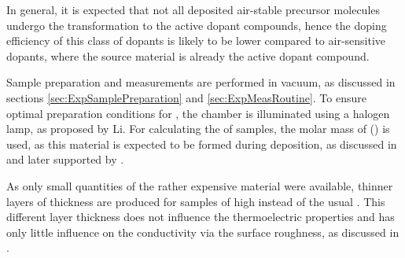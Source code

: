 In general, it is expected that not all deposited air-stable precursor molecules undergo the transformation to the active dopant compounds, hence the doping efficiency of this class of dopants is likely to be lower compared to air-sensitive dopants, where the source material is already the active dopant compound.

Sample preparation and measurements are performed in vacuum, as discussed in sections \ref{sec:ExpSamplePreparation} and \ref{sec:ExpMeasRoutine}.
To ensure optimal preparation conditions for \aob, the chamber is illuminated using a halogen lamp, as proposed by Li\etal\cite{Li2006}. For calculating the \CLong of \dmbiPOH samples, the molar mass of \OHdmbi () is used, as this material is expected to be formed during deposition, as discussed in  and later supported by .

As only small quantities of the rather expensive material \dmbi were available, thinner layers of  thickness are produced for samples of high \CLong {} instead of the usual . This different layer thickness does not influence the thermoelectric properties and has only little influence on the conductivity via the surface roughness, as discussed in .

